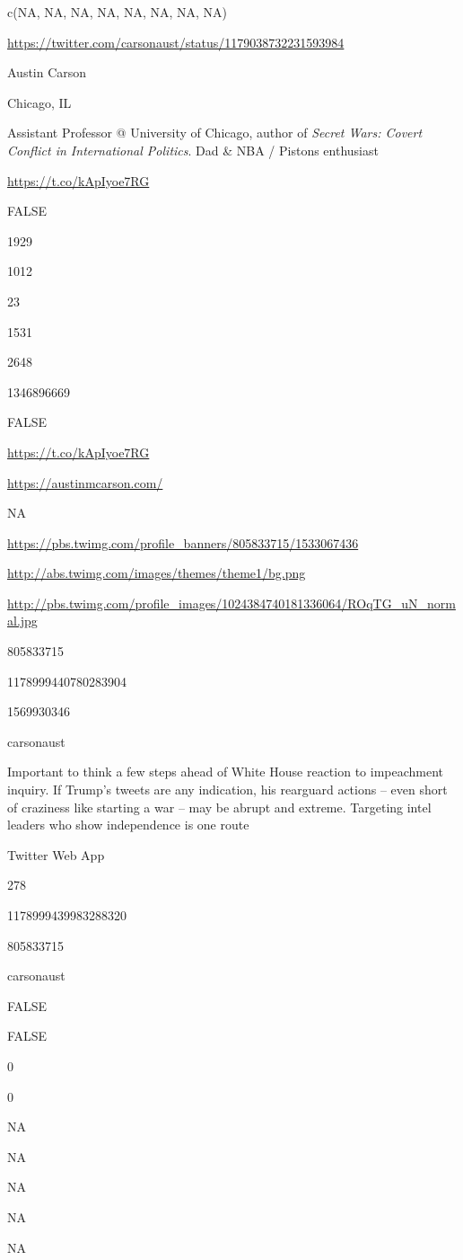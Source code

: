 \documentclass[]{book}
\begin{document}
c(NA, NA, NA, NA, NA, NA, NA, NA)

\url{https://twitter.com/carsonaust/status/1179038732231593984}

Austin Carson

Chicago, IL

Assistant Professor @ University of Chicago, author of \emph{Secret
Wars: Covert Conflict in International Politics}. Dad \& NBA / Pistons
enthusiast

\url{https://t.co/kApIyoe7RG}

FALSE

1929

1012

23

1531

2648

1346896669

FALSE

\url{https://t.co/kApIyoe7RG}

\url{https://austinmcarson.com/}

NA

\url{https://pbs.twimg.com/profile_banners/805833715/1533067436}

\url{http://abs.twimg.com/images/themes/theme1/bg.png}

\url{http://pbs.twimg.com/profile_images/1024384740181336064/ROqTG_uN_normal.jpg}

805833715

1178999440780283904

1569930346

carsonaust

Important to think a few steps ahead of White House reaction to
impeachment inquiry. If Trump's tweets are any indication, his rearguard
actions -- even short of craziness like starting a war -- may be abrupt
and extreme. Targeting intel leaders who show independence is one route

Twitter Web App

278

1178999439983288320

805833715

carsonaust

FALSE

FALSE

0

0

NA

NA

NA

NA

NA
\end{document}

